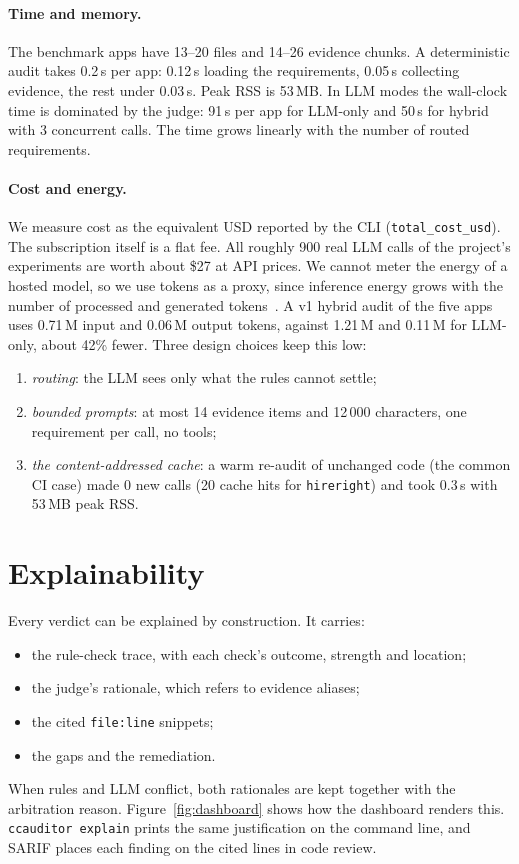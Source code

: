 \paragraph{Time and memory.} The benchmark apps have 13--20 files and 14--26 evidence chunks. A deterministic audit
takes 0.2\,s per app: 0.12\,s loading the requirements, 0.05\,s collecting evidence, the rest under 0.03\,s. Peak RSS
is 53\,MB. In LLM modes the wall-clock time is dominated by the judge: 91\,s per app for LLM-only and 50\,s for hybrid
with 3 concurrent calls. The time grows linearly with the number of routed requirements.

\paragraph{Cost and energy.} We measure cost as the equivalent USD reported by the CLI (\texttt{total\_cost\_usd}).
The subscription itself is a flat fee. All roughly 900 real LLM calls of the project's experiments are worth about \$27
at API prices. We cannot meter the energy of a hosted model, so we use tokens as a proxy, since inference energy grows
with the number of processed and generated tokens~\cite{luccioni2024power,strubell2019energy}. A v1 hybrid audit of the
five apps uses 0.71\,M input and 0.06\,M output tokens, against 1.21\,M and 0.11\,M for LLM-only, about 42\% fewer.
Three design choices keep this low:
\begin{enumerate}[leftmargin=*]
  \item \emph{routing}: the LLM sees only what the rules cannot settle;
  \item \emph{bounded prompts}: at most 14 evidence items and 12\,000 characters, one requirement per call, no tools;
  \item \emph{the content-addressed cache}: a warm re-audit of unchanged code (the common CI case) made 0 new calls
        (20 cache hits for \texttt{hireright}) and took 0.3\,s with 53\,MB peak RSS.
\end{enumerate}

\section{Explainability}
\label{section:explainability}

Every verdict can be explained by construction. It carries:
\begin{itemize}[leftmargin=*]
  \item the rule-check trace, with each check's outcome, strength and location;
  \item the judge's rationale, which refers to evidence aliases;
  \item the cited \texttt{file:line} snippets;
  \item the gaps and the remediation.
\end{itemize}
When rules and LLM conflict, both rationales are kept together with the arbitration reason.
Figure~\ref{fig:dashboard} shows how the dashboard renders this. \texttt{ccauditor explain} prints the same
justification on the command line, and SARIF places each finding on the cited lines in code review.

